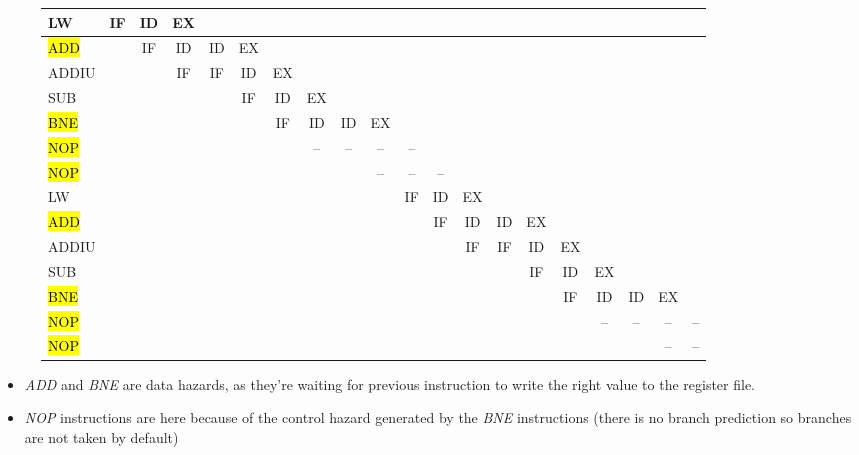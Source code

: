 \documentclass[a4paper]{report}
\begin{document}
\begin{figure}
	\begin{longtable} {|l|c|c|c|c|c|c|c|c|c|c|c|c|c|c|c|c|c|c|c|}
		\hline
		LW          & IF & ID & EX &    &    &    &    &    &    &    &    &    &    &    &    &    &    &    &    \\ \hline
		\hl{ADD}    &    & IF & ID & ID & EX &    &    &    &    &    &    &    &    &    &    &    &    &    &    \\ \hline
		ADDIU       &    &    & IF & IF & ID & EX &    &    &    &    &    &    &    &    &    &    &    &    &    \\ \hline
		SUB         &    &    &    &    & IF & ID & EX &    &    &    &    &    &    &    &    &    &    &    &    \\ \hline
		\hl{BNE}    &    &    &    &    &    & IF & ID & ID & EX &    &    &    &    &    &    &    &    &    &    \\ \hline
		\hl{NOP}    &    &    &    &    &    &    & -- & -- & -- & -- &    &    &    &    &    &    &    &    &    \\ \hline
		\hl{NOP}    &    &    &    &    &    &    &    &    & -- & -- & -- &    &    &    &    &    &    &    &    \\ \hline
		LW          &    &    &    &    &    &    &    &    &    & IF & ID & EX &    &    &    &    &    &    &    \\ \hline
		\hl{ADD}    &    &    &    &    &    &    &    &    &    &    & IF & ID & ID & EX &    &    &    &    &    \\ \hline
		ADDIU       &    &    &    &    &    &    &    &    &    &    &    & IF & IF & ID & EX &    &    &    &    \\ \hline
		SUB         &    &    &    &    &    &    &    &    &    &    &    &    &    & IF & ID & EX &    &    &    \\ \hline
		\hl{BNE}    &    &    &    &    &    &    &    &    &    &    &    &    &    &    & IF & ID & ID & EX &    \\ \hline
		\hl{NOP}    &    &    &    &    &    &    &    &    &    &    &    &    &    &    &    & -- & -- & -- & -- \\ \hline
		\hl{NOP}    &    &    &    &    &    &    &    &    &    &    &    &    &    &    &    &    &    & -- & -- \\ \hline
	\end{longtable}
\end{figure}

\begin{itemize}
	\item \textit{ADD} and \textit{BNE} are data hazards, as they're waiting for previous instruction to write the right value to the register file. \\
	\item \textit{NOP} instructions are here because of the control hazard generated by the \textit{BNE} instructions (there is no branch prediction so branches are not taken by default)

\end{itemize}
\end{document}
